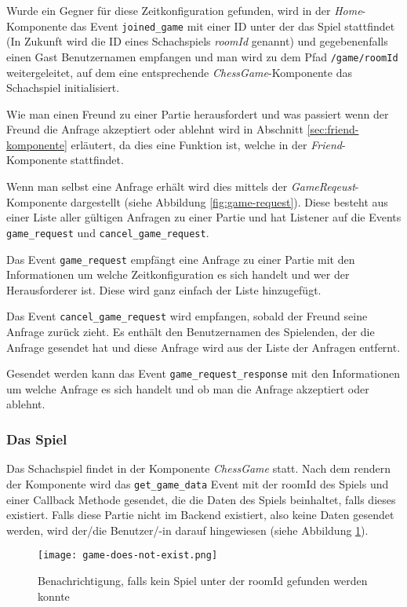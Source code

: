 Wurde ein Gegner für diese Zeitkonfiguration gefunden, wird in der \textit{Home}-Komponente das Event \verb|joined_game| mit einer ID unter der das Spiel stattfindet (In Zukunft wird die ID eines Schachspiels \textit{roomId} genannt) und gegebenenfalls einen Gast Benutzernamen empfangen und man wird zu dem Pfad \verb|/game/roomId| weitergeleitet, auf dem eine entsprechende \textit{ChessGame}-Komponente das Schachspiel initialisiert.

Wie man einen Freund zu einer Partie herausfordert und was passiert wenn der Freund die Anfrage akzeptiert oder ablehnt wird in Abschnitt \ref{sec:friend-komponente} erläutert, da dies eine Funktion ist, welche in der \textit{Friend}-Komponente stattfindet.

Wenn man selbst eine Anfrage erhält wird dies mittels der \textit{GameReqeust}-Komponente dargestellt (siehe Abbildung \ref{fig:game-request}). Diese besteht aus einer Liste aller gültigen Anfragen zu einer Partie und hat Listener auf die Events \verb|game_request| und \verb|cancel_game_request|. 

Das Event \verb|game_request| empfängt eine Anfrage zu einer Partie mit den Informationen um welche Zeitkonfiguration es sich handelt und wer der Herausforderer ist. Diese wird ganz einfach der Liste hinzugefügt. 

Das Event \verb|cancel_game_request| wird empfangen, sobald der Freund seine Anfrage zurück zieht. Es enthält den Benutzernamen des Spielenden, der die Anfrage gesendet hat und diese Anfrage wird aus der Liste der Anfragen entfernt.

Gesendet werden kann das Event \verb|game_request_response| mit den Informationen um welche Anfrage es sich handelt und ob man die Anfrage akzeptiert oder ablehnt.
        \subsubsection{Das Spiel}
        \label{sec:Das-Schachspiel-Front}
Das Schachspiel findet in der Komponente \textit{ChessGame} statt.
Nach dem rendern der Komponente wird das \verb|get_game_data| Event mit der roomId des Spiels und einer Callback Methode gesendet, die die Daten des Spiels beinhaltet, falls dieses existiert. Falls diese Partie nicht im Backend existiert, also keine Daten gesendet werden, wird der/die Benutzer/-in darauf hingewiesen (siehe Abbildung \ref{fig:game-does-not-exist}).

\begin{figure}[h]
\centering
\texttt{[image: game-does-not-exist.png]}
\caption{Benachrichtigung, falls kein Spiel unter der roomId gefunden werden konnte}
\label{fig:game-does-not-exist}
\end{figure}

